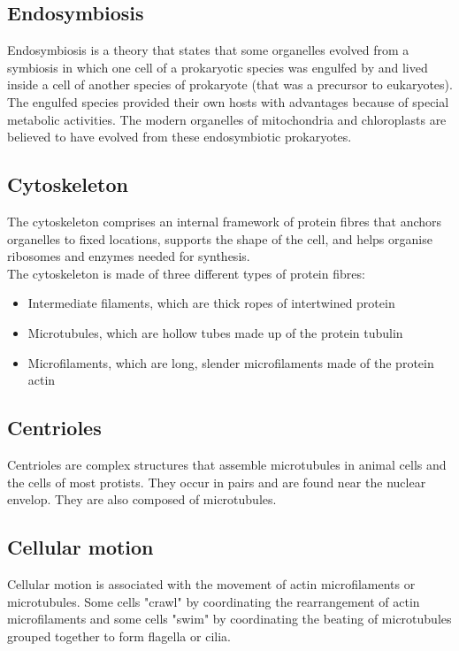 \documentclass[11pt]{article}
\begin{document}
\subsection{Endosymbiosis}
\label{sec:org4460e69}
Endosymbiosis is a theory that states that some organelles evolved from a symbiosis in which one cell of a prokaryotic species was engulfed by and lived inside a cell of another species of prokaryote (that was a precursor to eukaryotes). The engulfed species provided their own hosts with advantages because of special metabolic activities. The modern organelles of mitochondria and chloroplasts are believed to have evolved from these endosymbiotic prokaryotes.

\newpage

\subsection{Cytoskeleton}
\label{sec:org7f23bf2}
The cytoskeleton comprises an internal framework of protein fibres that anchors organelles to fixed locations, supports the shape of the cell, and helps organise ribosomes and enzymes needed for synthesis.
\\[0pt]

The cytoskeleton is made of three different types of protein fibres:
\begin{itemize}
\item Intermediate filaments, which are thick ropes of intertwined protein
\item Microtubules, which are hollow tubes made up of the protein tubulin
\item Microfilaments, which are long, slender microfilaments made of the protein actin
\end{itemize}

\subsection{Centrioles}
\label{sec:orgbc1a96f}
Centrioles are complex structures that assemble microtubules in animal cells and the cells of most protists. They occur in pairs and are found near the nuclear envelop. They are also composed of microtubules.

\subsection{Cellular motion}
\label{sec:orga80070d}
Cellular motion is associated with the movement of actin microfilaments or microtubules. Some cells "crawl" by coordinating the rearrangement of actin microfilaments and some cells "swim" by coordinating the beating of microtubules grouped together to form flagella or cilia.
\end{document}
